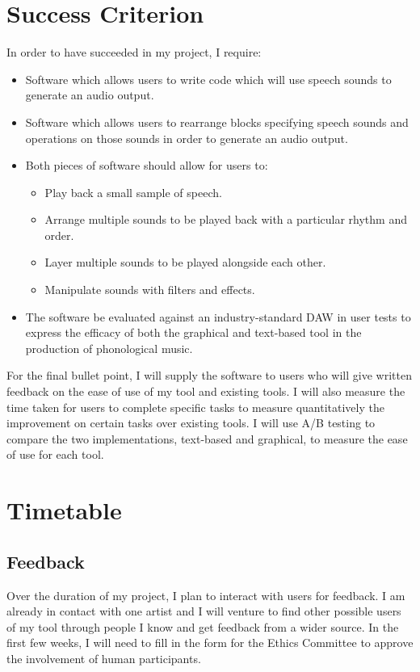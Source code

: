 \documentclass{article}
\begin{document}
\section*{Success Criterion}
In order to have succeeded in my project, I require:
\begin{itemize}
    \item Software which allows users to write code which will use speech sounds to generate an audio output.
    \item Software which allows users to rearrange blocks specifying speech sounds and operations on those sounds in order to generate an audio output.
    \item Both pieces of software should allow for users to:
    \begin{itemize}
        \item Play back a small sample of speech.
        \item Arrange multiple sounds to be played back with a particular rhythm and order.
        \item Layer multiple sounds to be played alongside each other.
        \item Manipulate sounds with filters and effects.
    \end{itemize}
    \item The software be evaluated against an industry-standard DAW in user tests to express the efficacy of both the graphical and text-based tool in the production of phonological music.
\end{itemize}
For the final bullet point, I will supply the software to users who will give written feedback on the ease of use of my tool and existing tools. I will also measure the time taken for users to complete specific tasks to measure quantitatively the improvement on certain tasks over existing tools. I will use A/B testing to compare the two implementations, text-based and graphical, to measure the ease of use for each tool.
\section*{Timetable}
\subsection*{Feedback}
Over the duration of my project, I plan to interact with users for feedback. I am already in contact with one artist and I will venture to find other possible users of my tool through people I know and get feedback from a wider source. In the first few weeks, I will need to fill in the form for the Ethics Committee to approve the involvement of human participants.
\end{document}
